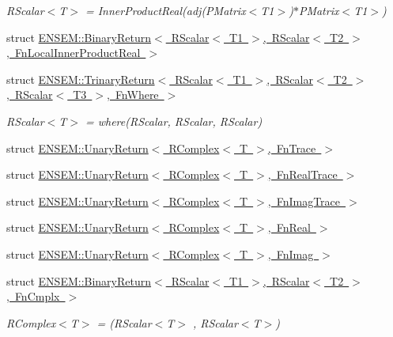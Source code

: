 \begin{DoxyCompactItemize}
\begin{DoxyCompactList}\small\item\em R\+Scalar$<$\+T$>$ = Inner\+Product\+Real(adj(\+P\+Matrix$<$\+T1$>$)$\ast$\+P\+Matrix$<$\+T1$>$) \end{DoxyCompactList}\item 
struct \mbox{\hyperlink{structENSEM_1_1BinaryReturn_3_01RScalar_3_01T1_01_4_00_01RScalar_3_01T2_01_4_00_01FnLocalInnerProductReal_01_4}{E\+N\+S\+E\+M\+::\+Binary\+Return$<$ R\+Scalar$<$ T1 $>$, R\+Scalar$<$ T2 $>$, Fn\+Local\+Inner\+Product\+Real $>$}}
\item 
struct \mbox{\hyperlink{structENSEM_1_1TrinaryReturn_3_01RScalar_3_01T1_01_4_00_01RScalar_3_01T2_01_4_00_01RScalar_3_01T3_01_4_00_01FnWhere_01_4}{E\+N\+S\+E\+M\+::\+Trinary\+Return$<$ R\+Scalar$<$ T1 $>$, R\+Scalar$<$ T2 $>$, R\+Scalar$<$ T3 $>$, Fn\+Where $>$}}
\begin{DoxyCompactList}\small\item\em R\+Scalar$<$\+T$>$ = where(\+R\+Scalar, R\+Scalar, R\+Scalar) \end{DoxyCompactList}\item 
struct \mbox{\hyperlink{structENSEM_1_1UnaryReturn_3_01RComplex_3_01T_01_4_00_01FnTrace_01_4}{E\+N\+S\+E\+M\+::\+Unary\+Return$<$ R\+Complex$<$ T $>$, Fn\+Trace $>$}}
\item 
struct \mbox{\hyperlink{structENSEM_1_1UnaryReturn_3_01RComplex_3_01T_01_4_00_01FnRealTrace_01_4}{E\+N\+S\+E\+M\+::\+Unary\+Return$<$ R\+Complex$<$ T $>$, Fn\+Real\+Trace $>$}}
\item 
struct \mbox{\hyperlink{structENSEM_1_1UnaryReturn_3_01RComplex_3_01T_01_4_00_01FnImagTrace_01_4}{E\+N\+S\+E\+M\+::\+Unary\+Return$<$ R\+Complex$<$ T $>$, Fn\+Imag\+Trace $>$}}
\item 
struct \mbox{\hyperlink{structENSEM_1_1UnaryReturn_3_01RComplex_3_01T_01_4_00_01FnReal_01_4}{E\+N\+S\+E\+M\+::\+Unary\+Return$<$ R\+Complex$<$ T $>$, Fn\+Real $>$}}
\item 
struct \mbox{\hyperlink{structENSEM_1_1UnaryReturn_3_01RComplex_3_01T_01_4_00_01FnImag_01_4}{E\+N\+S\+E\+M\+::\+Unary\+Return$<$ R\+Complex$<$ T $>$, Fn\+Imag $>$}}
\item 
struct \mbox{\hyperlink{structENSEM_1_1BinaryReturn_3_01RScalar_3_01T1_01_4_00_01RScalar_3_01T2_01_4_00_01FnCmplx_01_4}{E\+N\+S\+E\+M\+::\+Binary\+Return$<$ R\+Scalar$<$ T1 $>$, R\+Scalar$<$ T2 $>$, Fn\+Cmplx $>$}}
\begin{DoxyCompactList}\small\item\em R\+Complex$<$\+T$>$ = (R\+Scalar$<$\+T$>$ , R\+Scalar$<$\+T$>$) \end{DoxyCompactList}\item 

\end{DoxyCompactItemize}
